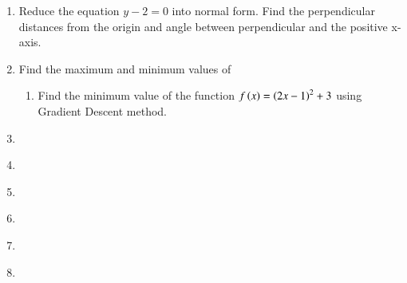 \begin{enumerate}[label=\thechapter.\arabic*,ref=\thechapter.\theenumi]
\item  Reduce the equation $y-2=0$ into normal form. Find the perpendicular distances from the origin and angle between perpendicular and the positive x-axis.
	\\
\solution 
\label{11/10/3/3/2/grad}

\item
Find the maximum and minimum values of  
	\begin{enumerate}
\item Find the minimum value of the function $f\left(x\right) = \left(2x-1\right)^2 + 3$ using Gradient Descent method. \\ 

\solution 
\label{12/6/5/1/1/2}

	\end{enumerate}
\iffalse
\item
\label{12/6/5/2}
%
\item
\label{12/6/5/3}

\item
\label{12/6/5/4}

\item
\label{12/6/5/5}

\fi
\item
\label{12/6/5/6}

\item
\label{12/6/5/7}

\item
\label{12/6/5/8}

\iffalse
\item
\label{12/6/5/9}
%
\fi
\item
\label{12/6/5/10}

\item
\label{12/6/5/11}

\item
\label{12/6/6/14}


\end{enumerate}
